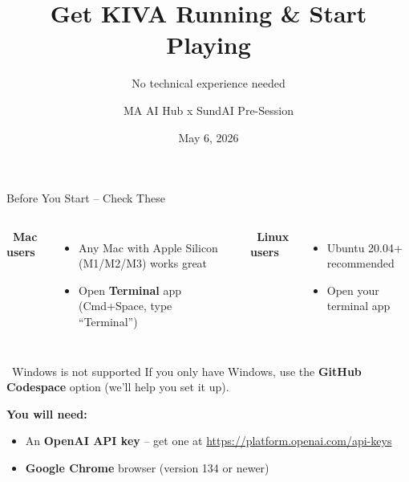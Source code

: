 \documentclass[aspectratio=169]{beamer}
\title[KIVA Setup \& Play]{Get KIVA Running \& Start Playing}
\subtitle{No technical experience needed}
\author{MA AI Hub x SundAI Pre-Session}
\date{May 6, 2026}
\begin{document}
\begin{frame}
\titlepage
\end{frame}


\begin{frame}{Before You Start -- Check These}
\begin{columns}[T]
\textbf{\faApple\ Mac users}
\begin{itemize}
    \item Any Mac with Apple Silicon (M1/M2/M3) works great
    \item Open \textbf{Terminal} app (Cmd+Space, type ``Terminal'')
\end{itemize}

\textbf{\faLinux\ Linux users}
\begin{itemize}
    \item Ubuntu 20.04+ recommended
    \item Open your terminal app
\end{itemize}
\end{columns}

\vspace{0.5cm}

\begin{alertblock}{\faExclamationTriangle\ Windows is not supported}
If you only have Windows, use the \textbf{GitHub Codespace} option (we'll help you set it up).
\end{alertblock}

\vspace{0.3cm}

\textbf{You will need:}
\begin{itemize}
    \item An \textbf{OpenAI API key} -- get one at \url{https://platform.openai.com/api-keys}
    \item \textbf{Google Chrome} browser (version 134 or newer)
\end{itemize}
\end{frame}
\end{document}
